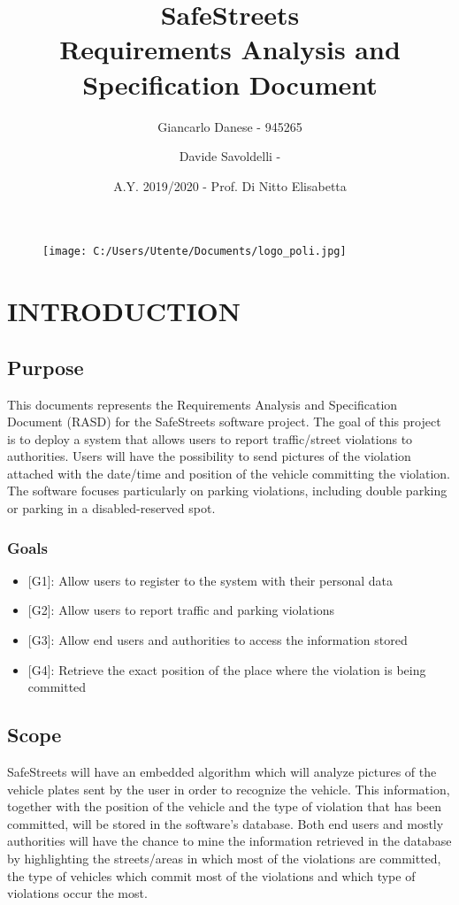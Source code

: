 \documentclass[12pt,a4paper]{article}
\author{Giancarlo Danese - 945265}
\author{Davide Savoldelli - }
\date{A.Y. 2019/2020 - Prof. Di Nitto Elisabetta}
\title{
 \textbf{\Huge{SafeStreets}} \\
 \large Requirements Analysis and Specification Document
}
\begin{document}
 \begin{figure}
  \centering
  \texttt{[image: C:/Users/Utente/Documents/logo\_poli.jpg]}
 \end{figure}

 \maketitle
 \newpage
 \tableofcontents
 \newpage

\section{INTRODUCTION}
\subsection{Purpose} 
This documents represents the Requirements Analysis and Specification Document (RASD) for the SafeStreets software project.
The goal of this project is to deploy a system that allows users to report traffic/street violations to authorities. Users will have the possibility to send pictures of the violation attached with the date/time and position of the vehicle committing the violation. The software focuses particularly on parking violations, including double parking or parking in a disabled-reserved spot.
\subsubsection{Goals}
\begin{itemize}
\item {[G1]}: Allow users to register to the system with their personal data
\item {[G2]}: Allow users to report traffic and parking violations 
\item {[G3]}: Allow end users and authorities to access the information stored
\item {[G4]}: Retrieve the exact position of the place where the violation is being committed
\end{itemize}
\subsection{Scope}
SafeStreets will have an embedded algorithm which will analyze pictures of the vehicle plates sent by the user in order to recognize the vehicle. This information, together with the position of the vehicle and the type of violation that has been committed, will be stored in the software's database. Both end users and mostly authorities will have the chance to mine the information retrieved in the database by highlighting the streets/areas in which most of the violations are committed, the type of vehicles which commit most of the violations and which type of violations occur the most. 		
\end{document}
